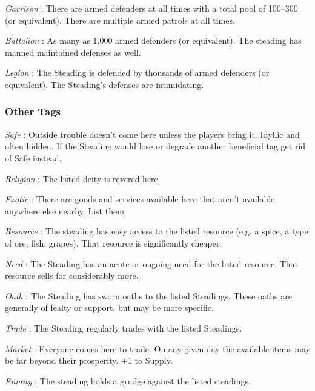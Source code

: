  

{\em Garrison} : There are armed defenders at all times with a total pool of 100–300 (or equivalent). There are multiple armed patrols at all times.

 

{\em Battalion} : As many as 1,000 armed defenders (or equivalent). The steading has manned maintained defenses as well.

 

{\em Legion} : The Steading is defended by thousands of armed defenders (or equivalent). The Steading's defenses are intimidating.

 
\subsubsection{Other Tags}   
 

{\em Safe} : Outside trouble doesn't come here unless the players bring it. Idyllic and often hidden. If the Steading would lose or degrade another beneficial tag get rid of Safe instead.

 

{\em Religion} : The listed deity is revered here.

 

{\em Exotic} : There are goods and services available here that aren't available anywhere else nearby. List them.

 

{\em Resource} : The steading has easy access to the listed resource (e.g. a spice, a type of ore, fish, grapes). That resource is significantly cheaper.

 

{\em Need} : The Steading has an acute or ongoing need for the listed resource. That resource sells for considerably more.

 

{\em Oath} : The Steading has sworn oaths to the listed Steadings. These oaths are generally of fealty or support, but may be more specific.

 

{\em Trade} : The Steading regularly trades with the listed Steadings.

 

{\em Market} : Everyone comes here to trade. On any given day the available items may be far beyond their prosperity. +1 to Supply.

 

{\em Enmity} : The steading holds a grudge against the listed steadings.

